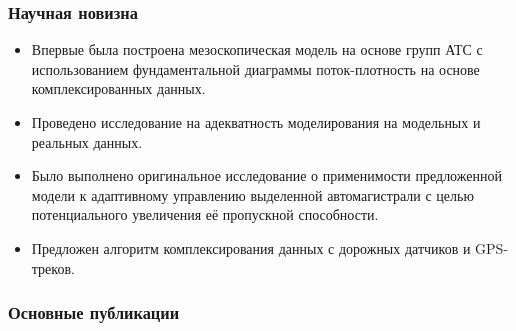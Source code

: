 \begin{frame}
    \frametitle{Научная новизна}
    \begin{itemize}
        \item Впервые была построена мезоскопическая модель на основе групп АТС с использованием фундаментальной диаграммы поток-плотность на основе комплексированных данных.
        \item Проведено исследование на адекватность моделирования на модельных и реальных данных.
        \item Было выполнено оригинальное исследование о применимости предложенной модели к адаптивному управлению выделенной автомагистрали с целью потенциального увеличения её пропускной способности.
        \item Предложен алгоритм комплексирования данных с дорожных датчиков и GPS-треков.
    \end{itemize}
\end{frame}

\begin{frame}[t,allowframebreaks] %
    \frametitle{Основные публикации}
    \nocite{star2016compl}%
    \nocite{star2017ident}%
    \nocite{star2021adaptcontrol}%
    \nocite{star2021statmod}%
    \nocite{collectiveArticle2}%
    \nocite{alekseenko2017adaptive}%
    \nocite{wosbib1}%
    \nocite{scbib1}%
    \nocite{confbib1}%
    \nocite{confbib2}%
    \nocite{bib1}%
    \nocite{bib2}%
\end{frame}

